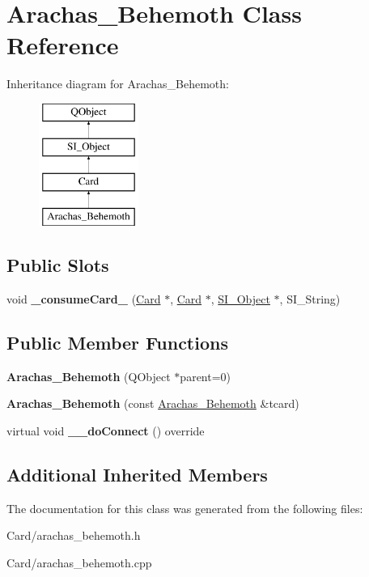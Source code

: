 \hypertarget{class_arachas___behemoth}{}\section{Arachas\+\_\+\+Behemoth Class Reference}
\label{class_arachas___behemoth}
Inheritance diagram for Arachas\+\_\+\+Behemoth\+:\begin{figure}[H]
\begin{center}
\leavevmode
\includegraphics[height=4.000000cm]{class_arachas___behemoth}
\end{center}
\end{figure}
\subsection*{Public Slots}
\begin{DoxyCompactItemize}
\item 
\mbox{\label{class_arachas___behemoth_aaad19d3efcc4787651c9a7e86e83ebf0}} 
void {\bfseries \+\_\+consume\+Card\+\_\+} (\hyperlink{class_card}{Card} $\ast$, \hyperlink{class_card}{Card} $\ast$, \hyperlink{class_s_i___object}{S\+I\+\_\+\+Object} $\ast$, S\+I\+\_\+\+String)
\end{DoxyCompactItemize}
\subsection*{Public Member Functions}
\begin{DoxyCompactItemize}
\item 
\mbox{\label{class_arachas___behemoth_a8411fe85bdf1a1c51239eb5ec0f7cdc6}} 
{\bfseries Arachas\+\_\+\+Behemoth} (Q\+Object $\ast$parent=0)
\item 
\mbox{\label{class_arachas___behemoth_af68743f4e1e53d11b2c6376224cb505c}} 
{\bfseries Arachas\+\_\+\+Behemoth} (const \hyperlink{class_arachas___behemoth}{Arachas\+\_\+\+Behemoth} \&tcard)
\item 
\mbox{\label{class_arachas___behemoth_a5a2140c5c619d9257cafe41b9647deeb}} 
virtual void {\bfseries \+\_\+\+\_\+do\+Connect} () override
\end{DoxyCompactItemize}
\subsection*{Additional Inherited Members}


The documentation for this class was generated from the following files\+:\begin{DoxyCompactItemize}
\item 
Card/arachas\+\_\+behemoth.\+h\item 
Card/arachas\+\_\+behemoth.\+cpp\end{DoxyCompactItemize}
